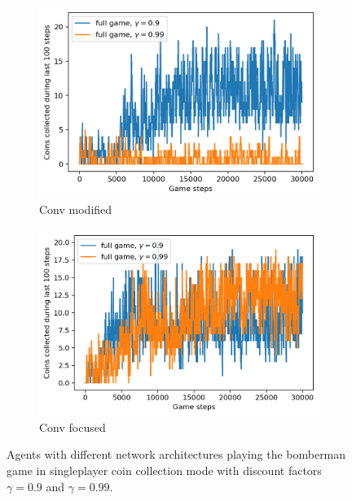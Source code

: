 
\begin{figure}
  \centering
  \begin{subfigure}[b]{0.48\linewidth}
    \centering
    	\includegraphics[width=\linewidth]{images/fullgame-conv1-4-3-arch.png}
    \caption{Conv modified}
    \label{fig:fullcoins-conv-mod}
  \end{subfigure}
  \quad
  \begin{subfigure}[b]{0.48\linewidth}
    \centering
      \includegraphics[width=\linewidth]{images/fullgame-focus-arch.png}
    \caption{Conv focused}
    \label{fig:fullcoins-conv-focus}
  \end{subfigure}
  \caption{Agents with different network architectures playing the bomberman game in singleplayer coin collection mode with discount factors $\gamma=0.9$ and $\gamma=0.99$.}
  \label{fig:fullcoins}
\end{figure}
